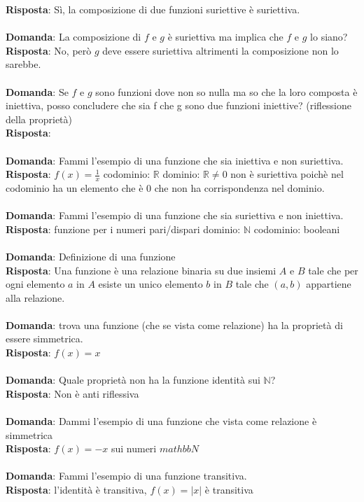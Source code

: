 \documentclass{article}
\begin{document}
\textbf{Risposta}: Sì, la composizione di due funzioni suriettive è suriettiva. \\ \\
\textbf{Domanda}: La composizione di $f$ e $g$ è suriettiva ma implica che $f$ e $g$ lo siano? \\
\textbf{Risposta}: No, però $g$ deve essere suriettiva altrimenti la composizione non lo sarebbe. \\ \\
\textbf{Domanda}: Se $f$ e $g$ sono funzioni dove non so nulla ma so che la loro composta è iniettiva, posso concludere che sia f che g sono due funzioni iniettive? (riflessione della proprietà)\\
\textbf{Risposta}: \\ \\
\textbf{Domanda}: Fammi l'esempio di una funzione che sia iniettiva e non suriettiva. \\
\textbf{Risposta}: $f(x) = \frac{1}{x}$ codominio: $\mathbb{R}$ dominio: $\mathbb{R} \neq 0$ non è suriettiva poichè nel codominio ha un elemento che è 0 che non ha corrispondenza nel dominio.\\ \\
\textbf{Domanda}: Fammi l'esempio di una funzione che sia suriettiva e non iniettiva. \\
\textbf{Risposta}: funzione per i numeri pari/dispari dominio: $\mathbb{N}$ codominio: booleani \\ \\
\textbf{Domanda}: Definizione di una funzione \\
\textbf{Risposta}: Una funzione è una relazione binaria su due insiemi $A$ e $B$ tale che per ogni elemento $a$ in $A$ esiste un unico elemento $b$ in $B$ tale che $(a,b)$ appartiene alla relazione. \\ \\
\textbf{Domanda}: trova una funzione (che se vista come relazione) ha la proprietà di essere simmetrica. \\
\textbf{Risposta}: $f(x)=x$ \\ \\
\textbf{Domanda}: Quale proprietà non ha la funzione identità sui $\mathbb{N}$? \\
\textbf{Risposta}: Non è anti riflessiva \\ \\
\textbf{Domanda}: Dammi l'esempio di una funzione che vista come relazione è simmetrica \\
\textbf{Risposta}: $f(x) = -x$ sui numeri $mathbb{N}$\\ \\
\textbf{Domanda}: Fammi l'esempio di una funzione transitiva. \\
\textbf{Risposta}:  l'identità è transitiva, $f(x)=|x|$ è transitiva \\ \\
\end{document}
